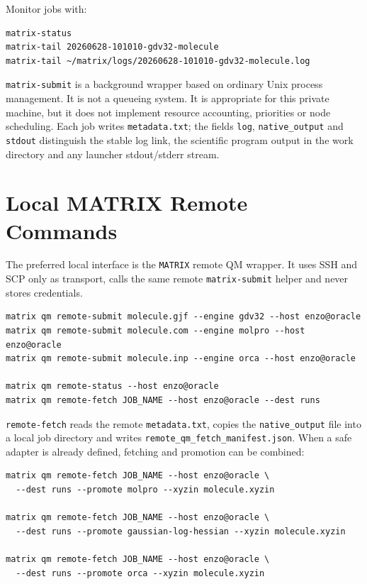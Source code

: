 \documentclass[11pt]{article}
\newcommand{\framework}{\texttt{MATRIX}}
\begin{document}
Monitor jobs with:

\begin{lstlisting}[style=matrix]
matrix-status
matrix-tail 20260628-101010-gdv32-molecule
matrix-tail ~/matrix/logs/20260628-101010-gdv32-molecule.log
\end{lstlisting}

\texttt{matrix-submit} is a background wrapper based on ordinary Unix process
management.  It is not a queueing system.  It is appropriate for this private
machine, but it does not implement resource accounting, priorities or node
scheduling.  Each job writes \texttt{metadata.txt}; the fields
\texttt{log}, \texttt{native\_output} and \texttt{stdout} distinguish the
stable log link, the scientific program output in the work directory and any
launcher stdout/stderr stream.

\section{Local MATRIX Remote Commands}

The preferred local interface is the \framework{} remote QM wrapper.  It uses
SSH and SCP only as transport, calls the same remote
\texttt{matrix-submit} helper and never stores credentials.

\begin{lstlisting}[style=matrix]
matrix qm remote-submit molecule.gjf --engine gdv32 --host enzo@oracle
matrix qm remote-submit molecule.com --engine molpro --host enzo@oracle
matrix qm remote-submit molecule.inp --engine orca --host enzo@oracle

matrix qm remote-status --host enzo@oracle
matrix qm remote-fetch JOB_NAME --host enzo@oracle --dest runs
\end{lstlisting}

\texttt{remote-fetch} reads the remote \texttt{metadata.txt}, copies the
\texttt{native\_output} file into a local job directory and writes
\texttt{remote\_qm\_fetch\_manifest.json}.  When a safe adapter is already
defined, fetching and promotion can be combined:

\begin{lstlisting}[style=matrix]
matrix qm remote-fetch JOB_NAME --host enzo@oracle \
  --dest runs --promote molpro --xyzin molecule.xyzin

matrix qm remote-fetch JOB_NAME --host enzo@oracle \
  --dest runs --promote gaussian-log-hessian --xyzin molecule.xyzin

matrix qm remote-fetch JOB_NAME --host enzo@oracle \
  --dest runs --promote orca --xyzin molecule.xyzin
\end{lstlisting}
\end{document}
